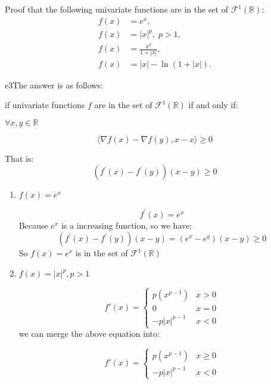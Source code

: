 \documentclass{article}
\begin{document}
\begin{excercise}\label{e3}
	Proof that the following univariate functions are in the set of $\mathcal{F}^1(\mathbb{R})$:
	\begin{align}
		f(x) &= e^x,\nonumber \\
		f(x) &= |x|^p,\; p > 1,\nonumber \\
		f(x) &= \frac{x^2}{1 + |x|},\nonumber \\
		f(x) &= |x| - \ln (1 + |x|).\nonumber
	\end{align}
\end{excercise}
\begin{PROOF}{e3}The answer is as follows:
	
	if univariate functions $f$ are in the set of $\mathcal{F}^1(\mathbb{R})$ if and only if:
	
	$\forall x,y \in \mathbb{R}$ 

	\begin{equation}
		\langle\nabla f(x)-\nabla f(y),x-x\rangle\ge 0
	\end{equation}

	That is:
	\begin{equation}
		\left( f^{'}(x)-f^{'}(y)\right) (x-y)\ge 0 
	\end{equation}

\begin{enumerate}
	\item $f(x)=e^x$
	
		\[
			f^{'}(x)=e^x
		\]
		Because $e^x$ is a increasing function, so we have:
		\begin{equation}
			\left( f^{'}(x)-f^{'}(y)\right) (x-y) =(e^x-e^y)(x-y)\ge 0
		\end{equation}
		So $f(x)=e^x$ is in the set of $\mathcal{F}^1(\mathbb{R})$
	\item $f(x)=\lvert x\rvert^p,p>1$
	
		\begin{equation}
			f{'}(x)=\begin{cases}
				p (x^{p-1})&x>0\\
				0&x=0\\
				-p\vert x\vert^{p-1}&x<0
			\end{cases}
		\end{equation}
		we can merge the above equation into:

		\begin{equation}
			f{'}(x)=\begin{cases}
				p(x^{p-1})&x\ge 0\\
				-p\vert x\vert^{p-1}&x<0
			\end{cases}
		\end{equation}


\end{enumerate}
\end{PROOF}
\end{document}
